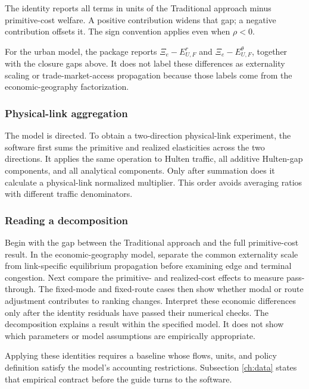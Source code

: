 The identity reports all terms in units of the Traditional approach minus
primitive-cost welfare. A positive contribution widens that gap; a negative
contribution offsets it. The sign convention applies even when \(\rho<0\).

For the urban model, the package reports
\(\Xi_e-E_{U,F}^r\) and
\(\Xi_e-E_{U,F}^{\theta}\), together with the closure gaps above. It does not
label these differences as externality scaling or trade-market-access
propagation because those labels come from the economic-geography
factorization.

\subsubsection{Physical-link aggregation}

The model is directed. To obtain a two-direction physical-link experiment, the
software first sums the primitive and realized elasticities across the two
directions. It applies the same operation to Hulten traffic, all additive
Hulten-gap components, and all analytical components.
Only after summation does it calculate a physical-link normalized multiplier.
This order avoids averaging ratios with different traffic denominators.


\subsubsection{Reading a decomposition}

Begin with the gap between the Traditional approach and the full
primitive-cost result. In the economic-geography model, separate the common
externality scale from link-specific equilibrium propagation before examining
edge and terminal congestion. Next compare the primitive- and realized-cost
effects to measure pass-through. The fixed-mode and fixed-route cases then show
whether modal or route adjustment contributes to ranking changes. Interpret
these economic differences only after the identity residuals have passed their
numerical checks.
The decomposition explains a result within the specified model. It does not
show which parameters or model assumptions are empirically appropriate.

Applying these identities requires a baseline whose flows, units, and policy
definition satisfy the model's accounting restrictions. Subsection
\ref{ch:data} states that empirical contract before the guide turns to the
software.
